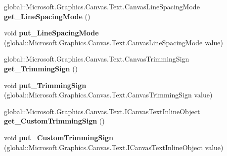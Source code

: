\begin{DoxyCompactItemize}
\mbox{\label{interface_microsoft_1_1_graphics_1_1_canvas_1_1_text_1_1_i_canvas_text_format_ab83d69682b1282cc0203333291e4df42}} 
global\+::\+Microsoft.\+Graphics.\+Canvas.\+Text.\+Canvas\+Line\+Spacing\+Mode {\bfseries get\+\_\+\+Line\+Spacing\+Mode} ()
\item 
\mbox{\label{interface_microsoft_1_1_graphics_1_1_canvas_1_1_text_1_1_i_canvas_text_format_a1a3230a7d36b210e60927960396f0c69}} 
void {\bfseries put\+\_\+\+Line\+Spacing\+Mode} (global\+::\+Microsoft.\+Graphics.\+Canvas.\+Text.\+Canvas\+Line\+Spacing\+Mode value)
\item 
\mbox{\label{interface_microsoft_1_1_graphics_1_1_canvas_1_1_text_1_1_i_canvas_text_format_a470488d4549d1bc276b39772375c8064}} 
global\+::\+Microsoft.\+Graphics.\+Canvas.\+Text.\+Canvas\+Trimming\+Sign {\bfseries get\+\_\+\+Trimming\+Sign} ()
\item 
\mbox{\label{interface_microsoft_1_1_graphics_1_1_canvas_1_1_text_1_1_i_canvas_text_format_ac8017ec2b958d4f84c22ffd8b24319e5}} 
void {\bfseries put\+\_\+\+Trimming\+Sign} (global\+::\+Microsoft.\+Graphics.\+Canvas.\+Text.\+Canvas\+Trimming\+Sign value)
\item 
\mbox{\label{interface_microsoft_1_1_graphics_1_1_canvas_1_1_text_1_1_i_canvas_text_format_a66d3e1355a4ce968e56b2239fdcd9fc5}} 
global\+::\+Microsoft.\+Graphics.\+Canvas.\+Text.\+I\+Canvas\+Text\+Inline\+Object {\bfseries get\+\_\+\+Custom\+Trimming\+Sign} ()
\item 
\mbox{\label{interface_microsoft_1_1_graphics_1_1_canvas_1_1_text_1_1_i_canvas_text_format_aefe2238d3d79706b8cfa6e70171a651c}} 
void {\bfseries put\+\_\+\+Custom\+Trimming\+Sign} (global\+::\+Microsoft.\+Graphics.\+Canvas.\+Text.\+I\+Canvas\+Text\+Inline\+Object value)
\item 
\mbox{\label{interface_microsoft_1_1_graphics_1_1_canvas_1_1_text_1_1_i_canvas_text_format_ad08083df7e2d44e9c7e2515e41680d6c}} 

\end{DoxyCompactItemize}
